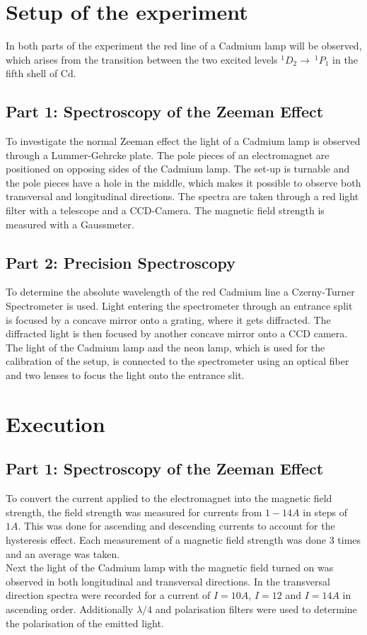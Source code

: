 \documentclass[12pt]{article}
\begin{document}
\section{Setup of the experiment}
In both parts of the experiment the red line of a Cadmium lamp will be observed, which arises from the transition between the two excited levels $^1D_2\rightarrow \ ^1P_1$ in the fifth shell of Cd.
\subsection{Part 1: Spectroscopy of the Zeeman Effect}
To investigate the normal Zeeman effect the light of a Cadmium lamp is observed through a Lummer-Gehrcke plate. The pole pieces of an electromagnet are positioned on opposing sides of the Cadmium lamp. The set-up is turnable and the pole pieces have a hole in the middle, which makes it possible to observe both transversal and longitudinal directions. The spectra are taken through a red light filter with a telescope and a CCD-Camera. The magnetic field strength is measured with a Gaussmeter.
\subsection{Part 2: Precision Spectroscopy}
To determine the absolute wavelength of the red Cadmium line a Czerny-Turner Spectrometer is used. Light entering the spectrometer through an entrance split is focused by a concave mirror onto a grating, where it gets diffracted. The diffracted light is then focused by another concave mirror onto a CCD camera. The light of the Cadmium lamp and the neon lamp, which is used for the calibration of the setup, is connected to the spectrometer using an optical fiber and two lenses to focus the light onto the entrance slit. 

\section{Execution}
\subsection{Part 1: Spectroscopy of the Zeeman Effect}
To convert the current applied to the electromagnet into the magnetic field strength, the field strength was measured for currents from $1-14A$ in steps of $1A$. This was done for ascending and descending currents to account for the hysteresis effect. Each measurement of a magnetic field strength was done 3 times and an average was taken.
\\Next the light of the Cadmium lamp with the magnetic field turned on was observed in both longitudinal and transversal directions. In the transversal direction spectra were recorded for a current of $I=10A$, $I=12$ and $I=14A$ in ascending order. Additionally $\lambda/4$ and polarisation filters were used to determine the polarisation of the emitted light. 
\end{document}

